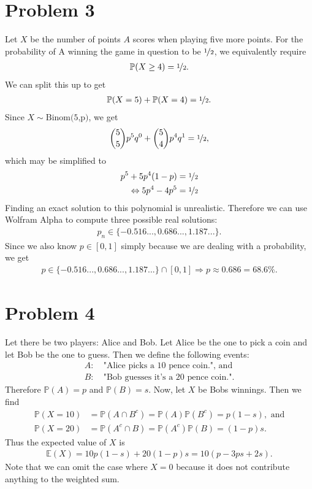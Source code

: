 \documentclass{article}
\renewcommand{\P}{\mathbb{P}}
\newcommand{\E}{\mathbb{E}}
\begin{document}
\section*{Problem 3}
Let $X$ be the number of points $A$ scores when playing five more points.
For the probability of A winning the game in question
to be $\nicefrac{1}{2}$, we equivalently require
\begin{align*}
  \P(X\geq 4) = \nicefrac{1}{2}.
\end{align*}
We can split this up to get
\begin{align*}
  \P(X = 5) + \P(X = 4) = \nicefrac{1}{2}.
\end{align*}
Since $X\sim\text{Binom(5,p)}$, we get
\begin{align*}
  \binom{5}{5}p^5q^0+\binom{5}{4}p^4q^1=\nicefrac{1}{2},
\end{align*}
which may be simplified to
\begin{align*}
  p^5+5p^4(1-p) &= \nicefrac{1}{2}\\
  \Leftrightarrow 5p^4-4p^5&=\nicefrac{1}{2}
\end{align*}
Finding an exact solution to this polynomial is unrealistic.
Therefore we can use Wolfram Alpha to compute three possible real solutions:
\begin{align*}
  p_n \in \{-0.516..., 0.686..., 1.187...\}.
\end{align*}
Since we also know $p\in[0,1]$ simply because we are dealing with a
probability, we get
\begin{align*}
  p\in \{-0.516..., 0.686..., 1.187...\} \cap [0,1] \Rightarrow p \approx 0.686=68.6\%.
\end{align*}
\section*{Problem 4}
Let there be two players: Alice and Bob. Let Alice be the one to pick
a coin and let Bob be the one to guess. Then we define the following
events:
\begin{align*}
  A:&\:\text{"Alice picks a 10 pence coin.", and}\\
  B:&\:\text{"Bob guesses it's a 20 pence coin."}.
\end{align*}
Therefore $\P(A)=p$ and $\P(B)=s$. 
Now, let $X$ be Bobs winnings. Then we find
\begin{align*}
  \P(X=10) &= \P(A\cap B^c) = \P(A)\P(B^c) = p(1-s),\text{ and}\\
  \P(X=20) &= \P(A^c\cap B) = \P(A^c)\P(B) = (1-p)s.
\end{align*}
Thus the expected value of $X$ is
\begin{align*}
  \E(X) = 10p(1-s)+20(1-p)s = 10(p - 3ps + 2s).
\end{align*}
Note that we can omit the case where $X=0$ because it does
not contribute anything to the weighted sum.
\end{document}
